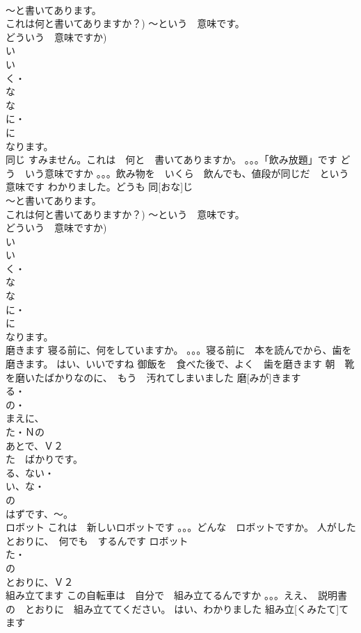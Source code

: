 \documentclass[8pt]{extreport}
\begin{document}
\begin{CJK}{UTF8}{min}
\\	～と書いてあります。
\\	これは何と書いてありますか？) ～という　意味です。
\\	どういう　意味ですか) 
\\	い
\\	い
\\	く・
\\	な
\\	な
\\	に・
\\	に　
\\	なります。
\\	同じ	すみません。これは　何と　書いてありますか。 。。。「飲み放題」です どう　いう意味ですか 。。。飲み物を　いくら　飲んでも、値段が同じだ　という意味です わかりました。どうも	同[おな]じ			
\\	～と書いてあります。
\\	これは何と書いてありますか？) ～という　意味です。
\\	どういう　意味ですか) 
\\	い
\\	い
\\	く・
\\	な
\\	な
\\	に・
\\	に　
\\	なります。
\\	磨きます	寝る前に、何をしていますか。 。。。寝る前に　本を読んでから、歯を磨きます。 はい、いいですね 御飯を　食べた後で、よく　歯を磨きます 朝　靴を磨いたばかりなのに、　もう　汚れてしまいました	磨[みが]きます			
\\	る・
\\	の・
\\	まえに、
\\	た・Ｎの
\\	あとで、Ｖ２
\\	た　ばかりです。
\\	る、ない・
\\	い、な・
\\	の
\\	はずです、～。
\\	ロボット	これは　新しいロボットです 。。。どんな　ロボットですか。 人がした　とおりに、　何でも　するんです	ロボット				
\\	た・
\\	の
\\	とおりに、Ｖ２
\\	組み立てます	この自転車は　自分で　組み立てるんですか 。。。ええ、　説明書の　とおりに　組み立ててください。 はい、わかりました	組み立[くみたて]てます			

\end{CJK}
\end{document}
